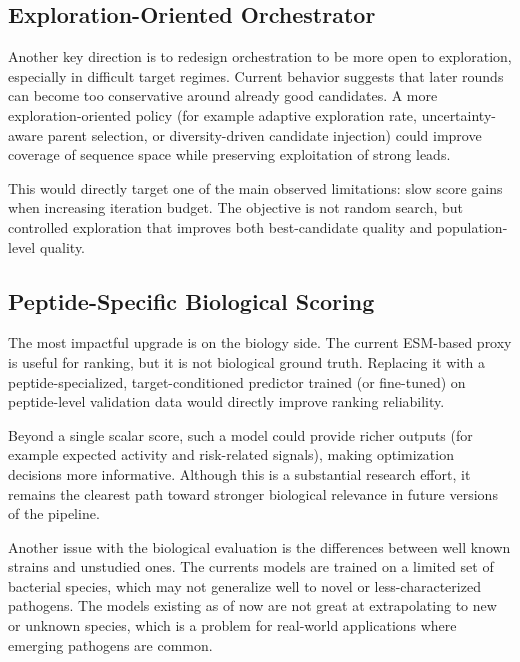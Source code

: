 \subsection{Exploration-Oriented Orchestrator}
Another key direction is to redesign orchestration to be more open to exploration, especially in difficult target regimes. Current behavior suggests that later rounds can become too conservative around already good candidates. A more exploration-oriented policy (for example adaptive exploration rate, uncertainty-aware parent selection, or diversity-driven candidate injection) could improve coverage of sequence space while preserving exploitation of strong leads.

This would directly target one of the main observed limitations: slow score gains when increasing iteration budget. The objective is not random search, but controlled exploration that improves both best-candidate quality and population-level quality.

\subsection{Peptide-Specific Biological Scoring}\label{subsec:future_biologist}
The most impactful upgrade is on the biology side. The current ESM-based proxy is useful for ranking, but it is not biological ground truth. Replacing it with a peptide-specialized, target-conditioned predictor trained (or fine-tuned) on peptide-level validation data would directly improve ranking reliability.

Beyond a single scalar score, such a model could provide richer outputs (for example expected activity and risk-related signals), making optimization decisions more informative. Although this is a substantial research effort, it remains the clearest path toward stronger biological relevance in future versions of the pipeline.

Another issue with the biological evaluation is the differences between well known strains and unstudied ones. The currents models are trained on a limited set of bacterial species, which may not generalize well to novel or less-characterized pathogens. The models existing as of now are not great at extrapolating to new or unknown species, which is a problem for real-world applications where emerging pathogens are common.
